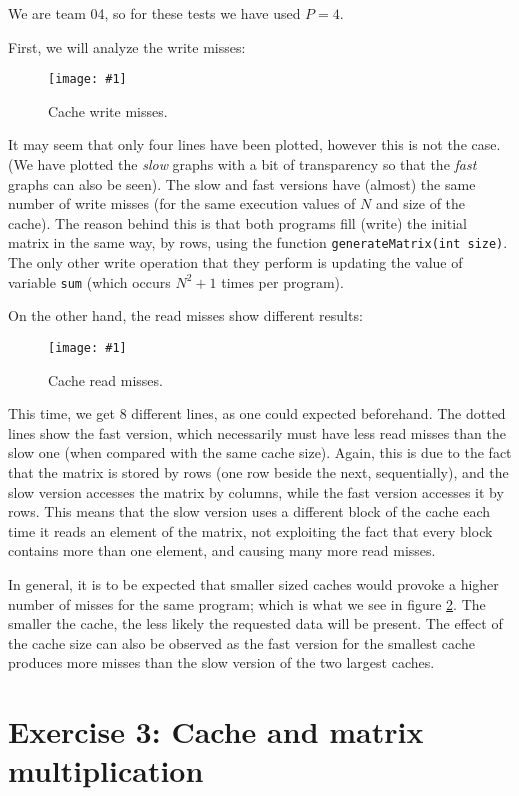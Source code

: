\documentclass{article}
\newcommand{\myFigure}[4]{%
    \begin{figure}[!ht]
        \texttt{[image: \#1]}
        \centering
        \caption{#2}
        \label{#3}
    \end{figure}
}
\begin{document}
We are team 04, so for these tests we have used $P=4$.

First, we will analyze the write misses: 

\myFigure{../material_P3/out2/mv_att1/cache_escritura.png}{Cache write misses.}{cache_escritura}{0.545}


It may seem that only four lines have been plotted, however this is not the case. (We have plotted the \emph{slow} graphs with a bit of transparency so that the \emph{fast} graphs can also be seen). The slow and fast versions have (almost) the same number of write misses (for the same execution values of $N$ and size of the cache). The reason behind this is that both programs fill (write) the initial matrix in the same way, by rows, using the function \texttt{generateMatrix(int size)}. The only other write operation that they perform is updating the value of variable \texttt{sum} (which occurs $N^2+1$ times per program). 

On the other hand, the read misses show different results:

\myFigure{../material_P3/out2/mv_att1/cache_lectura.png}{Cache read misses.}{cache_lectura}{0.545}

This time, we get 8 different lines, as one could expected beforehand. The dotted lines show the fast version, which necessarily must have less read misses than the slow one (when compared with the same cache size). Again, this is due to the fact that the matrix is stored by rows (one row beside the next, sequentially), and the slow version accesses the matrix by columns, while the fast version accesses it by rows. This means that the slow version uses a different block of the cache each time it reads an element of the matrix, not exploiting the fact that every block contains more than one element, and causing many more read misses.

In general, it is to be expected that smaller sized caches would provoke a higher number of misses for the same program; which is what we see in figure \ref{cache_lectura}. The smaller the cache, the less likely the requested data will be present.
The effect of the cache size can also be observed as the fast version for the smallest cache produces more misses than the slow version of the two largest caches. 


\section*{Exercise 3:  Cache and matrix multiplication}
\end{document}
